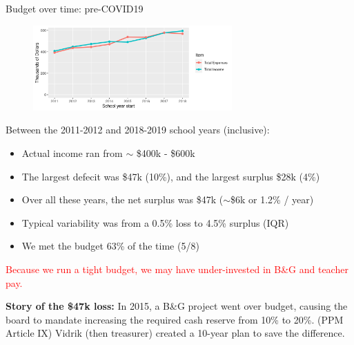 \documentclass[8pt]{beamer}
\begin{document}

\begin{frame}{Budget over time: pre-COVID19}
\begin{figure}
\begin{center}
\includegraphics[width=3in]{budget_history.png}
\end{center}
\end{figure}

Between the 2011-2012 and 2018-2019 school years (inclusive):
%
\begin{itemize}
%
\item Actual income ran from $\sim$ \$400k - \$600k
\item The largest defecit was \$47k (10\%), and the largest surplus \$28k (4\%)
\item Over all these years, the net surplus was \$47k ($\sim$\$6k or 1.2\% / year)
\item Typical variability was from a 0.5\% loss to 4.5\% surplus (IQR)
\item We met the budget 63\% of the time (5/8)
%
\end{itemize}
%
\textcolor{red}{Because we run a tight budget, we may have
under-invested in B\&G and teacher pay.}

\textbf{Story of the \$47k loss:}
In 2015, a B\&G project went over budget, causing the board to mandate
increasing the required cash reserve from 10\% to 20\%.
(PPM Article IX)
Vidrik (then treasurer) created a 10-year plan to save the difference.

\end{frame}


\end{document}
